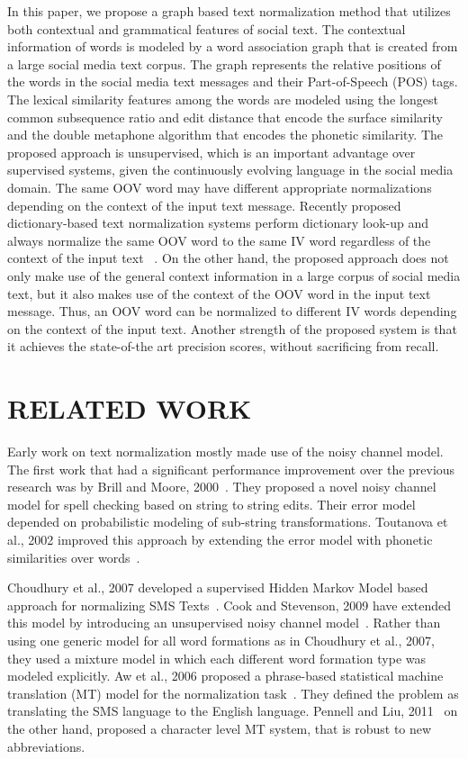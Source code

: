 \documentclass[a4paper,onesided,12pt]{report}
\begin{document}
In this paper, we propose a graph based text normalization method that utilizes both contextual and grammatical features of social text. The contextual information of words is modeled by a word association graph that is created from a large social media text corpus. The graph represents the relative positions of the words in the social media text messages and their Part-of-Speech (POS) tags. The lexical similarity features among the words are modeled using the longest common subsequence ratio and edit distance that encode the surface similarity and the double metaphone algorithm that encodes the phonetic similarity. The proposed approach is unsupervised, which is an important advantage over supervised systems, given the continuously evolving language in the social media domain. The same OOV word may have different appropriate normalizations depending on the context of the input text message. Recently proposed dictionary-based text normalization systems perform dictionary look-up and always normalize the same OOV word to the same IV word regardless of the context of the input text ~\cite{Han:2011:LNS:2002472.2002520,DBLP:conf/acl/HassanM13}. On the other hand, the proposed approach does not only make use of the general context information in a large corpus of social media text, but it also makes use of the context of the OOV word in the input text message. Thus, an OOV word can be normalized to different IV words depending on the context of the input text. Another strength of the proposed system is that it achieves the state-of-the art precision scores, without sacrificing from recall.

\chapter{RELATED WORK}
\label{chapter:related}

Early work on text normalization mostly made use of the noisy channel model. The first work that had a significant performance improvement over the previous research was by Brill and Moore, 2000~\cite{Brill:2000:IEM:1075218.1075255}. They proposed a novel noisy channel model for spell checking based on string to string edits. Their error model depended on probabilistic modeling of sub-string transformations. Toutanova et al., 2002 improved this approach by extending the error model with phonetic similarities over words~\cite{Toutanova:2002:PMI:1073083.1073109}.

Choudhury et al., 2007 developed a supervised Hidden Markov Model based approach for normalizing SMS Texts~\cite{Choudhury:2007:IMS:1326044.1326048}. Cook and Stevenson, 2009 have extended this model by introducing an unsupervised noisy channel model~\cite{Cook:2009:UMT:1642011.1642021}. Rather than using one generic model for all word formations as in Choudhury et al., 2007, they used a mixture model in which each different word formation type was modeled explicitly. Aw et al., 2006 proposed a phrase-based statistical machine translation (MT) model for the normalization task~\cite{Aw:2006:PSM:1273073.1273078}. They defined the problem as translating the SMS language to the English language. Pennell and Liu, 2011~\cite{pennell2011character} on the other hand, proposed a character level MT system, that is robust to new abbreviations.
\end{document}
